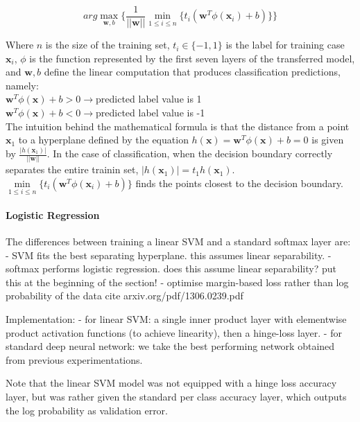 \documentclass[a4paper,11pt]{article}
\begin{document}
\begin{equation}
arg\max\limits_{\textbf{w},b}\{\frac{1}{||\textbf{w}||} \min\limits_{1 \leq i \leq n}\{t_i (\textbf{w}^T \phi(\textbf{x}_i)+b)\}\}
\end{equation}

Where $n$ is the size of the training set, $t_i \in \{-1,1\}$ is the label for training case $\textbf{x}_i$, $\phi$ is the function represented by the first seven layers of the transferred model, and $\textbf{w},b$ define the linear computation that produces classification predictions, namely: \\

$\textbf{w}^T \phi(\textbf{x}) + b > 0 \rightarrow $predicted label value is 1 \\
$\textbf{w}^T \phi(\textbf{x}) + b < 0 \rightarrow $predicted label value is -1 \\

The intuition behind the mathematical formula is that the distance from a point $\textbf{x}_1$ to a hyperplane defined by the equation $h(\textbf{x}) = \textbf{w}^T \phi(\textbf{x}) + b = 0$ is given by $\frac{|h(\textbf{x}_1)|}{||\textbf{w}||}$. In the case of classification, when the decision boundary correctly separates the entire trainin set, $|h(\textbf{x}_1)| = t_1 h(\textbf{x}_1)$. $\min\limits_{1 \leq i \leq n}\{t_i (\textbf{w}^T \phi(\textbf{x}_i)+b)\}$ finds the points closest to the decision boundary. \\


\paragraph{Logistic Regression}


The differences between training a linear SVM and a standard softmax layer are:
- SVM fits the best separating hyperplane. this assumes linear separability. 
- softmax performs logistic regression. does this assume linear separability?
put this at the beginning of the section!
- optimise margin-based loss rather than log probability of the data
{cite arxiv.org/pdf/1306.0239.pdf}


Implementation:
- for linear SVM: a single inner product layer with elementwise product activation functions (to achieve linearity), then a hinge-loss layer.
- for standard deep neural network: we take the best performing network obtained from previous experimentations.

Note that the linear SVM model was not equipped with a hinge loss accuracy layer, but was rather given the standard per class accuracy layer, which outputs the log probability as validation error. 
\end{document}
